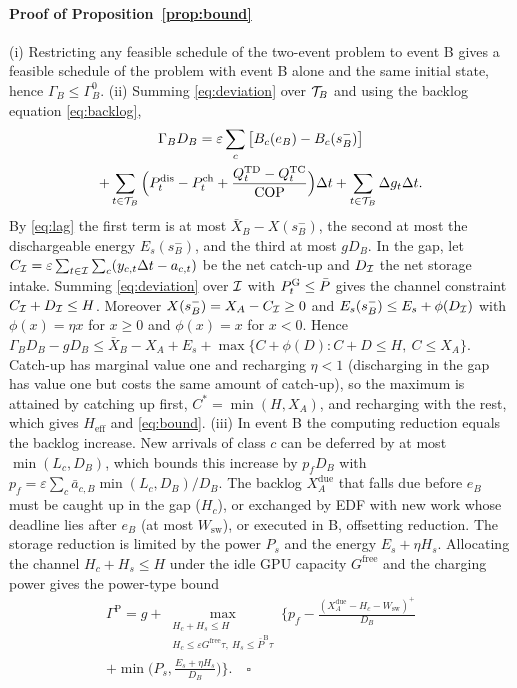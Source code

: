 \paragraph{Proof of Proposition~\ref{prop:bound}} (i) Restricting any feasible schedule of the two-event problem to event
B gives a feasible schedule of the problem with event B alone and the same initial state, hence $\Gamma_B\le\Gamma_B^0$.
(ii) Summing \eqref{eq:deviation} over $\mathcal{T}_B$ and using the backlog equation \eqref{eq:backlog},
\begin{multline*}
\Gamma_BD_B=\varepsilon\sum_c\big[B_c(e_B)-B_c(s_B^-)\big]\\
+\sum_{t\in\mathcal{T}_{B}}\Big(P^{\mathrm{dis}}_t-P^{\mathrm{ch}}_t+\frac{Q^{\mathrm{TD}}_t-Q^{\mathrm{TC}}_t}{\mathrm{COP}}\Big)\Delta t+\sum_{t\in\mathcal{T}_{B}}\Delta g_t\Delta t .
\end{multline*}
By \eqref{eq:lag} the first term is at most $\bar X_B-X(s_B^-)$, the second at most the dischargeable energy $E_s(s_B^-)$,
and the third at most $gD_B$. In the gap, let $C_{\mathcal{I}}=\varepsilon\sum_{t\in\mathcal{I}}\sum_c(y_{c,t}\Delta t-a_{c,t})$ be the net
catch-up and $D_{\mathcal{I}}$ the net storage intake. Summing \eqref{eq:deviation} over $\mathcal{I}$ with $P^{\mathrm{G}}_t\le\bar P$ gives the
channel constraint $C_{\mathcal{I}}+D_{\mathcal{I}}\le H$. Moreover $X(s_B^-)=X_A-C_{\mathcal{I}}\ge0$ and $E_s(s_B^-)\le E_s+\phi(D_{\mathcal{I}})$ with
$\phi(x)=\eta x$ for $x\ge0$ and $\phi(x)=x$ for $x<0$. Hence
$\Gamma_BD_B-gD_B\le\bar X_B-X_A+E_s+\max\{C+\phi(D):C+D\le H,\ C\le X_A\}$. Catch-up has marginal value one and
recharging $\eta<1$ (discharging in the gap has value one but costs the same amount of catch-up), so the maximum is
attained by catching up first, $C^*=\min(H,X_A)$, and recharging with the rest, which gives $H_{\mathrm{eff}}$ and
\eqref{eq:bound}. (iii) In event B the computing reduction equals the backlog increase. New arrivals of class $c$ can be
deferred by at most $\min(L_c,D_B)$, which bounds this increase by $p_fD_B$ with
$p_f=\varepsilon\sum_c\bar a_{c,B}\min(L_c,D_B)/D_B$. The backlog $X_A^{\mathrm{due}}$ that falls due before $e_B$ must be
caught up in the gap ($H_c$), or exchanged by EDF with new work whose deadline lies after $e_B$ (at most $W_{\mathrm{sw}}$),
or executed in B, offsetting reduction. The storage reduction is limited by the power $P_s$ and the energy
$E_s+\eta H_s$. Allocating the channel $H_c+H_s\le H$ under the idle GPU capacity $G^{\mathrm{free}}$ and the charging
power gives the power-type bound
\begin{multline}
\Gamma^{\mathrm P}=g+\max_{\substack{H_c+H_s\le H\\ H_c\le\varepsilon G^{\mathrm{free}}\tau,\ H_s\le\bar P^{\mathrm B}\tau}}
\Big\{p_f-\frac{(X_A^{\mathrm{due}}-H_c-W_{\mathrm{sw}})^+}{D_B}\\
+\min\Big(P_s,\frac{E_s+\eta H_s}{D_B}\Big)\Big\}. \quad\square
\label{eq:boundP}
\end{multline}

